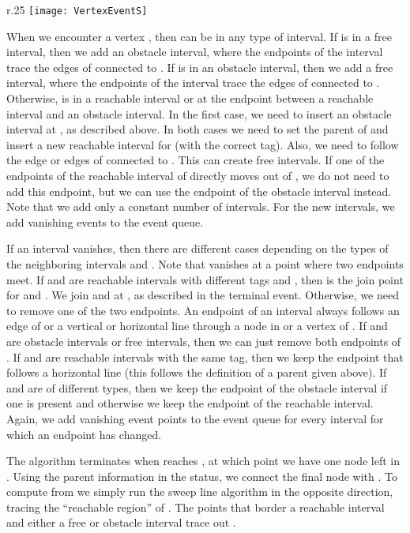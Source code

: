 \documentclass{journalA4}
\begin{document}
\begin{wrapfigure}[8]{r}{.25\textwidth}
\centering
\texttt{[image: VertexEventS]}
\end{wrapfigure}
 When we encounter a vertex , then  can be in any type of interval. If  is in a free interval, then we add an obstacle interval, where the endpoints of the interval trace the edges of  connected to . If  is in an obstacle interval, then we add a free interval, where the endpoints of the interval trace the edges of  connected to . Otherwise,  is in a reachable interval or at the endpoint between a reachable interval and an obstacle interval. In the first case, we need to insert an obstacle interval at , as described above. In both cases we need to set the parent of  and insert a new reachable interval for  (with the correct tag). Also, we need to follow the edge or edges of  connected to . This can create free intervals. If one of the endpoints of the reachable interval of  directly moves out of , we do not need to add this endpoint, but we can use the endpoint of the obstacle interval instead. Note that we add only a constant number of intervals. For the new intervals, we add vanishing events to the event queue.

 If an interval  vanishes, then there are different cases depending on the types of the neighboring intervals  and . Note that  vanishes at a point  where two endpoints meet. If  and  are reachable intervals with different tags  and , then  is the join point for  and . We join  and  at , as described in the terminal event. Otherwise, we need to remove one of the two endpoints. An endpoint of an interval always follows an edge of  or a vertical or horizontal line through a node in  or a vertex of . If  and  are obstacle intervals or free intervals, then we can just remove both endpoints of . If  and  are reachable intervals with the same tag, then we keep the endpoint that follows a horizontal line (this follows the definition of a parent given above).
If  and  are of different types, then we keep the endpoint of the obstacle interval if one is present and otherwise we keep the endpoint of the reachable interval. Again, we add vanishing event points to the event queue for every interval for which an endpoint has changed.

\smallskip
\noindent
The algorithm terminates when  reaches , at which point we have one node left in . Using the parent information in the status, we
connect the final node with . To compute  from  we simply run the sweep line algorithm in the opposite direction, tracing the ``reachable region'' of . The points that border a reachable interval and either a free or obstacle interval trace out .
\end{document}
